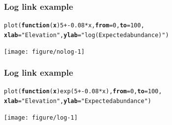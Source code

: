 \documentclass[color=usenames,dvipsnames]{beamer}\usepackage[]{graphicx}\usepackage[]{color}
\makeatletter
\newcommand{\hlnum}[1]{\textcolor[rgb]{0.69,0.494,0}{#1}}%
\newcommand{\hlstr}[1]{\textcolor[rgb]{0.749,0.012,0.012}{#1}}%
\newcommand{\hlopt}[1]{\textcolor[rgb]{0,0,0}{#1}}%
\newcommand{\hlstd}[1]{\textcolor[rgb]{0,0,0}{#1}}%
\newcommand{\hlkwa}[1]{\textcolor[rgb]{0,0,0}{\textbf{#1}}}%
\newcommand{\hlkwc}[1]{\textcolor[rgb]{0,0,0}{\textbf{#1}}}%
\newcommand{\hlkwd}[1]{\textcolor[rgb]{0.004,0.004,0.506}{#1}}%
\newenvironment{kframe}{%
 \def\at@end@of@kframe{}%
 \ifinner\ifhmode%
  \def\at@end@of@kframe{\end{minipage}}%
  \begin{minipage}{\columnwidth}%
 \fi\fi%
 \def\FrameCommand##1{\hskip\@totalleftmargin \hskip-\fboxsep
 \colorbox{shadecolor}{##1}\hskip-\fboxsep
     \hskip-\linewidth \hskip-\@totalleftmargin \hskip\columnwidth}%
 \MakeFramed {\advance\hsize-\width
   \@totalleftmargin\z@ \linewidth\hsize
   \@setminipage}}%
 {\par\unskip\endMakeFramed%
 \at@end@of@kframe}
\newenvironment{knitrout}{}{} %
\makeatother
\begin{document}
\begin{frame}[fragile]
  \frametitle{Log link example}
  \footnotesize
\begin{knitrout}\footnotesize
{}\color{fgcolor}\begin{kframe}
\begin{alltt}
\hlkwd{plot}\hlstd{(}\hlkwa{function}\hlstd{(}\hlkwc{x}\hlstd{)} \hlnum{5} \hlopt{+ -}\hlnum{0.08}\hlopt{*}\hlstd{x,} \hlkwc{from}\hlstd{=}\hlnum{0}\hlstd{,} \hlkwc{to}\hlstd{=}\hlnum{100}\hlstd{,}
     \hlkwc{xlab}\hlstd{=}\hlstr{"Elevation"}\hlstd{,} \hlkwc{ylab}\hlstd{=}\hlstr{"log(Expected abundance)"}\hlstd{)}
\end{alltt}
\end{kframe}
\end{knitrout}
\begin{center}
  \texttt{[image: figure/nolog-1]}
\end{center}
\end{frame}




\begin{frame}[fragile]
  \frametitle{Log link example}
  \footnotesize
\begin{knitrout}\footnotesize
{}\color{fgcolor}\begin{kframe}
\begin{alltt}
\hlkwd{plot}\hlstd{(}\hlkwa{function}\hlstd{(}\hlkwc{x}\hlstd{)} \hlkwd{exp}\hlstd{(}\hlnum{5} \hlopt{+ -}\hlnum{0.08}\hlopt{*}\hlstd{x),} \hlkwc{from}\hlstd{=}\hlnum{0}\hlstd{,} \hlkwc{to}\hlstd{=}\hlnum{100}\hlstd{,}
     \hlkwc{xlab}\hlstd{=}\hlstr{"Elevation"}\hlstd{,} \hlkwc{ylab}\hlstd{=}\hlstr{"Expected abundance"}\hlstd{)}
\end{alltt}
\end{kframe}
\end{knitrout}
\begin{center}
  \texttt{[image: figure/log-1]}
\end{center}
\end{frame}






\end{document}
